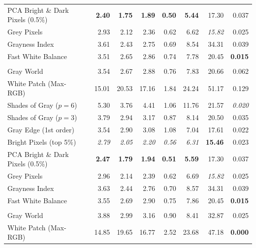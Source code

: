 \begin{longtable}{@{}>{\raggedright\arraybackslash}p{6.8cm}rrrrrrr@{}}
PCA Bright \& Dark Pixels (0.5\%)~\cite{cheng2014illuminant} & \textbf{2.40} & \textbf{1.75} & \textbf{1.89} & \textbf{0.50} & \textbf{5.44} & 17.30 & 0.037 \\
Grey Pixels~\cite{yangGrayPixels} & 2.93 & 2.12 & 2.36 & 0.62 & 6.62 & \textit{15.82} & 0.025 \\
Grayness Index~\cite{qianFindingGrayPixels} & 3.61 & 2.43 & 2.75 & 0.69 & 8.54 & 34.31 & 0.039 \\
Fast White Balance~\cite{fast_wb_greyness} & 3.51 & 2.65 & 2.86 & 0.74 & 7.78 & 20.45 & \textbf{0.015} \\
\midrule
\multicolumn{8}{@{}l}{\textbf{NUS 8-Camera (extended)~\cite{cheng2014illuminant} ($N=1853$)}} \\
\midrule
Gray World~\cite{gray_world} & 3.54 & 2.67 & 2.88 & 0.76 & 7.83 & 20.66 & 0.062 \\
White Patch (Max-RGB)~\cite{white_patch} & 15.01 & 20.53 & 17.16 & 1.84 & 24.24 & 51.17 & 0.129 \\
Shades of Gray ($p=6$)~\cite{shades_of_gray} & 5.30 & 3.76 & 4.41 & 1.06 & 11.76 & 21.57 & \textit{0.020} \\
Shades of Gray ($p=3$)~\cite{shades_of_gray} & 3.79 & 2.94 & 3.17 & 0.87 & 8.14 & 20.50 & 0.035 \\
Gray Edge (1st order)~\cite{gray_edge} & 3.54 & 2.90 & 3.08 & 1.08 & 7.04 & 17.61 & 0.022 \\
Bright Pixels (top 5\%)~\cite{bright_pixels} & \textit{2.79} & \textit{2.05} & \textit{2.20} & \textit{0.56} & \textit{6.31} & \textbf{15.46} & 0.023 \\
PCA Bright \& Dark Pixels (0.5\%)~\cite{cheng2014illuminant} & \textbf{2.47} & \textbf{1.79} & \textbf{1.94} & \textbf{0.51} & \textbf{5.59} & 17.30 & 0.037 \\
Grey Pixels~\cite{yangGrayPixels} & 2.96 & 2.14 & 2.39 & 0.62 & 6.69 & \textit{15.82} & 0.025 \\
Grayness Index~\cite{qianFindingGrayPixels} & 3.63 & 2.44 & 2.76 & 0.70 & 8.57 & 34.31 & 0.039 \\
Fast White Balance~\cite{fast_wb_greyness} & 3.55 & 2.69 & 2.90 & 0.75 & 7.86 & 20.45 & \textbf{0.015} \\
\midrule
\multicolumn{8}{@{}l}{\textbf{LSMI~\cite{kim2021lsmi} ($N=3396$)}} \\
\midrule
Gray World~\cite{gray_world} & 3.88 & 2.99 & 3.16 & 0.90 & 8.41 & 32.87 & 0.025 \\
White Patch (Max-RGB)~\cite{white_patch} & 14.85 & 19.65 & 16.77 & 2.52 & 23.68 & 47.18 & \textbf{0.000} \\

\end{longtable}
